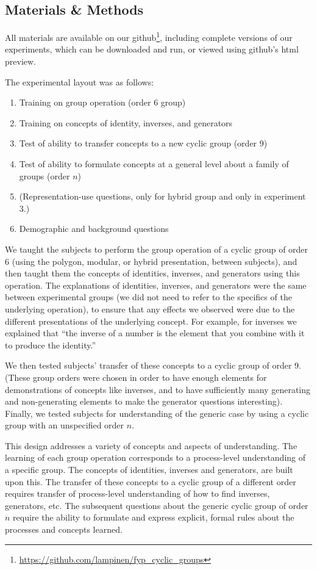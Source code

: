 \documentclass[man,10pt]{apa6}
\begin{document}
\subsection{Materials \& Methods} 
All materials are available on our github\footnote{\url{https://github.com/lampinen/fyp_cyclic_groups}}, including complete versions of our experiments, which can be downloaded and run, or viewed using github's html preview. \par
The experimental layout was as follows:
\begin{enumerate}
\item Training on group operation (order 6 group)
\item Training on concepts of identity, inverses, and generators
\item Test of ability to transfer concepts to a new cyclic group (order 9)
\item Test of ability to formulate concepts at a general level about a family of groups (order $n$)
\item (Representation-use questions, only for hybrid group and only in experiment 3.)
\item Demographic and background questions
\end{enumerate}
We taught the subjects to perform the group operation of a cyclic group of order 6 (using the polygon, modular, or hybrid presentation, between subjects), and then taught them the concepts of identities, inverses, and generators using this operation. The explanations of identities, inverses, and generators were the same between experimental groups (we did not need to refer to the specifics of the underlying operation), to ensure that any effects we observed were due to the different presentations of the underlying concept. For example, for inverses we explained that ``the inverse of a number is the element that you combine with it to produce the identity.''\par
We then tested subjects' transfer of these concepts to a cyclic group of order 9. (These group orders were chosen in order to have enough elements for demonstrations of concepts like inverses, and to have sufficiently many generating and non-generating elements to make the generator questions interesting). Finally, we tested subjects for understanding of the generic case by using a cyclic group with an unspecified order $n$. \par
This design addresses a variety of concepts and aspects of understanding. The learning of each group operation corresponds to a process-level understanding of a specific group. The concepts of identities, inverses and generators, are built upon this. The transfer of these concepts to a cyclic group of a different order requires transfer of process-level understanding of how to find inverses, generators, etc. The subsequent questions about the generic cyclic group of order $n$ require the ability to formulate and express explicit, formal rules about the processes and concepts learned. 
\end{document}
